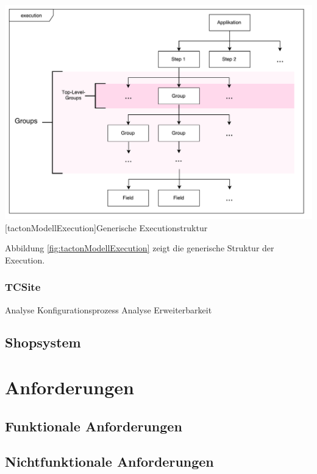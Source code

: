 \documentclass[12pt,a4paper,bibliography=totocnumbered,listof=totoc]{scrartcl}
\begin{document}
\vspace{1em}
\begin{minipage}{\linewidth}
	\centering
	\includegraphics[width=1\linewidth]{Abbildungen/tactonModellExecution.pdf}
	[tactonModellExecution]{Generische Executionstruktur}
	\label{fig:tactonModellExecution}
\end{minipage}
\vspace{1em}

Abbildung \ref{fig:tactonModellExecution} zeigt die generische Struktur der Execution.

\pagebreak
\subsubsection{TCSite}
Analyse Konfigurationsprozess
Analyse Erweiterbarkeit

\subsection{Shopsystem}

\pagebreak

\section{Anforderungen}

\subsection{Funktionale Anforderungen}

\subsection{Nichtfunktionale Anforderungen}
\end{document}
